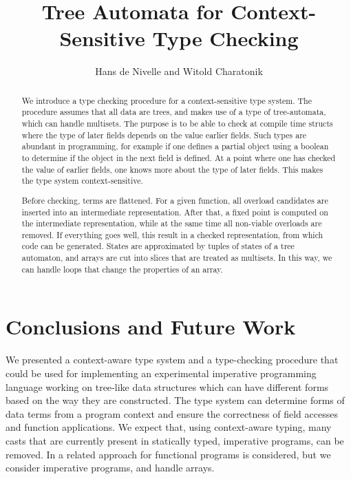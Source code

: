 \documentclass{llncs}
\title{Tree Automata for Context-Sensitive Type Checking}
\author{Hans de Nivelle and Witold Charatonik}
\institute{Instytut Informatyki Uniwersytetu Wroc{\l }awskiego \\
           Wybrze\.{z}e~Joliot-Curie~15, 50-383, Wroc{\l }aw, Poland}
\begin{document}
\maketitle

\begin{abstract}
   We introduce a type checking procedure for a context-sensitive type
   system. The procedure assumes that all data are trees, and
   makes use of a type of tree-automata, which can handle multisets.
   The purpose is to be able to check at compile time structs
   where the type of later fields depends on the value earlier fields.
   Such types are abundant in programming, for example if one defines
   a partial object using a boolean to determine if the object
   in the next field is defined.
   At a point where one has checked the value of earlier fields, one
   knows more about the type of later fields. This makes the
   type system context-sensitive.

   Before checking, terms are flattened. For a given
   function, all overload candidates are inserted into
   an intermediate representation.
   After that, a fixed point is computed on the intermediate
   representation, while at the same time 
   all non-viable overloads are removed.
   If everything goes well, this result in a
   checked representation, from which code can be generated.
   States are approximated by tuples of states of a tree automaton,
   and arrays are cut into slices that are treated as multisets.
   In this way, we can handle loops that change the properties
   of an array.
\end{abstract}













\section{Conclusions and Future Work}
\label{Sect_concl_fut}

We presented a context-aware type system and a type-checking procedure
that could be used for implementing an experimental imperative
programming language working on tree-like data structures
which can have different forms based on the way they are constructed.
The type system can determine forms of data terms from a program
context and ensure the correctness of field accesses and function applications.
We expect that, using context-aware typing, many casts that 
are currently present in statically typed,
imperative programs, can be removed. 
In \cite{AlexanderAikenBrianMurphy1991_1} a related approach for
functional programs is considered, 
but we consider imperative programs, and handle arrays.
\end{document}
